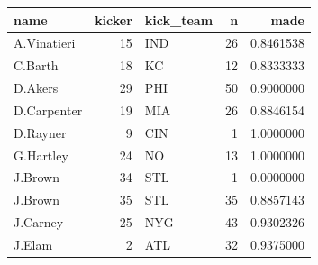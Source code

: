 \documentclass[
  11pt,
]{book}
\theoremstyle{definition}
\theoremstyle{definition}
\theoremstyle{definition}
\theoremstyle{definition}
\theoremstyle{remark}
\begin{document}
\begin{tabular}{lrlrr}
\toprule
name & kicker & kick\_team & n & made\\
\midrule
A.Vinatieri & 15 & IND & 26 & 0.8461538\\
C.Barth & 18 & KC & 12 & 0.8333333\\
D.Akers & 29 & PHI & 50 & 0.9000000\\
D.Carpenter & 19 & MIA & 26 & 0.8846154\\
D.Rayner & 9 & CIN & 1 & 1.0000000\\
\addlinespace
G.Hartley & 24 & NO & 13 & 1.0000000\\
J.Brown & 34 & STL & 1 & 0.0000000\\
J.Brown & 35 & STL & 35 & 0.8857143\\
J.Carney & 25 & NYG & 43 & 0.9302326\\
J.Elam & 2 & ATL & 32 & 0.9375000\\
\bottomrule
\end{tabular}

\newpage
\end{document}
